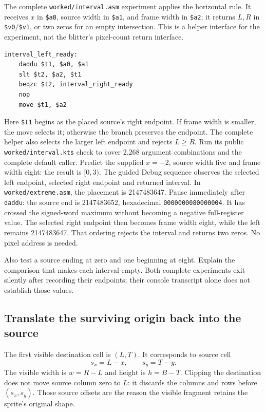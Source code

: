 The complete \texttt{worked/interval.asm} experiment applies the horizontal rule.
It receives $x$ in \texttt{\$a0}, source width in \texttt{\$a1}, and frame width
in \texttt{\$a2}; it returns $L,R$ in \texttt{\$v0}/\texttt{\$v1}, or two
zeros for an empty intersection. This is a helper interface for the experiment,
not the blitter's pixel-count return interface.

\noindent\begin{minipage}{\linewidth}
  \begin{verbatim}
interval_left_ready:
    daddu $t1, $a0, $a1
    slt $t2, $a2, $t1
    beqzc $t2, interval_right_ready
    nop
    move $t1, $a2
\end{verbatim}
\end{minipage}

Here \texttt{\$t1} begins as the placed source's right endpoint. If frame width
is smaller, the move selects it; otherwise the branch preserves the endpoint.
The complete helper also selects the larger left endpoint and rejects $L\geq R$.
Run its public \texttt{worked/interval.kts} check to cover 2,268 argument combinations and the complete default caller. Predict the
supplied $x=-2$, source width five and frame width eight: the result is $[0,3)$.
The guided Debug sequence observes the selected left endpoint, selected right
endpoint and returned interval. In \texttt{worked/extreme.asm}, the placement is
2147483647. Pause immediately after \texttt{daddu}: the source end is 2147483652,
hexadecimal \texttt{0000000080000004}. It has crossed the signed-word maximum
without becoming a negative full-register value. The selected right endpoint then
becomes frame width eight, while the left remains 2147483647. That ordering rejects
the interval and returns two zeros. No pixel address is needed.

Also test a source ending at zero and one beginning at eight. Explain the
comparison that makes each interval empty. Both complete experiments exit
silently after recording their endpoints; their console transcript alone does
not establish those values.

\subsection*{Translate the surviving origin back into the source}

The first visible destination cell is $(L,T)$. It corresponds to source cell
\[
  s_x=L-x,\qquad s_y=T-y.
\]
The visible width is $w=R-L$ and height is $h=B-T$. Clipping the destination does
not move source column zero to $L$: it discards the columns and rows before
$(s_x,s_y)$. Those source offsets are the reason the visible fragment retains the
sprite's original shape.

